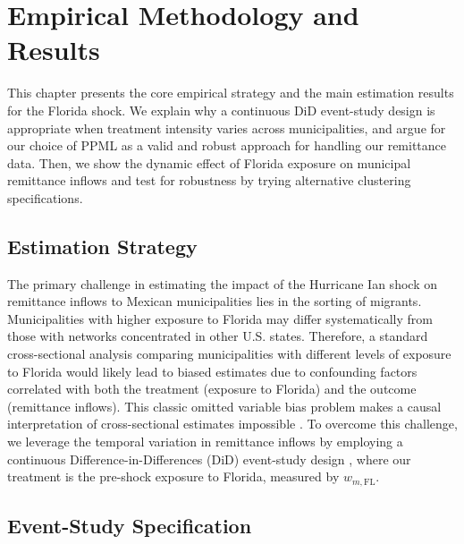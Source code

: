 \chapter{Empirical Methodology and Results} \label{chap:shock_results}
This chapter presents the core empirical strategy and the main estimation results for the Florida shock. We explain why a continuous DiD event-study design is appropriate when treatment intensity varies across municipalities, and argue for our choice of PPML as a valid and robust approach for handling our remittance data. Then, we show the dynamic effect of Florida exposure on municipal remittance inflows and test for robustness by trying alternative clustering specifications.

\section{Estimation Strategy}

The primary challenge in estimating the impact of the Hurricane Ian shock on remittance inflows to Mexican municipalities lies in the sorting of migrants. Municipalities with higher exposure to Florida may differ systematically from those with networks concentrated in other U.S. states. Therefore, a standard cross-sectional analysis comparing municipalities with different levels of exposure to Florida would likely lead to biased estimates due to confounding factors correlated with both the treatment (exposure to Florida) and the outcome (remittance inflows). This classic omitted variable bias problem makes a causal interpretation of cross-sectional estimates impossible \parencite{wooldridge2010}. To overcome this challenge, we leverage the temporal variation in remittance inflows by employing a continuous Difference-in-Differences (DiD) event-study design \parencite{callaway2024}, where our treatment is the pre-shock exposure to Florida, measured by $w_{m,\text{FL}}$. 

\section{Event-Study Specification}

